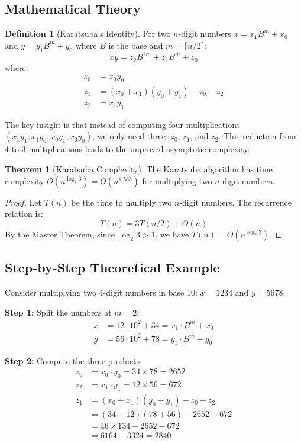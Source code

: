 \documentclass[12pt,a4paper]{article}
\theoremstyle{definition}
\newtheorem{definition}{Definition}[section]
\newtheorem{theorem}{Theorem}[section]
\begin{document}
\subsection{Mathematical Theory}

\begin{definition}[Karatsuba's Identity]
For two $n$-digit numbers $x = x_1B^m + x_0$ and $y = y_1B^m + y_0$ where $B$ is the base and $m = \lceil n/2 \rceil$:
\[xy = z_2B^{2m} + z_1B^m + z_0\]
where:
\begin{align}
z_0 &= x_0y_0\\
z_1 &= (x_0 + x_1)(y_0 + y_1) - z_0 - z_2\\
z_2 &= x_1y_1
\end{align}
\end{definition}

The key insight is that instead of computing four multiplications $(x_1y_1, x_1y_0, x_0y_1, x_0y_0)$, we only need three: $z_0$, $z_1$, and $z_2$. This reduction from 4 to 3 multiplications leads to the improved asymptotic complexity.

\begin{theorem}[Karatsuba Complexity]
The Karatsuba algorithm has time complexity $O(n^{\log_2 3}) = O(n^{1.585})$ for multiplying two $n$-digit numbers.
\end{theorem}

\begin{proof}
Let $T(n)$ be the time to multiply two $n$-digit numbers. The recurrence relation is:
\[T(n) = 3T(n/2) + O(n)\]
By the Master Theorem, since $\log_2 3 > 1$, we have $T(n) = O(n^{\log_2 3})$.
\end{proof}

\subsection{Step-by-Step Theoretical Example}

Consider multiplying two 4-digit numbers in base 10: $x = 1234$ and $y = 5678$.

\textbf{Step 1:} Split the numbers at $m = 2$:
\begin{align}
x &= 12 \cdot 10^2 + 34 = x_1 \cdot B^m + x_0\\
y &= 56 \cdot 10^2 + 78 = y_1 \cdot B^m + y_0
\end{align}

\textbf{Step 2:} Compute the three products:
\begin{align}
z_0 &= x_0 \cdot y_0 = 34 \times 78 = 2652\\
z_2 &= x_1 \cdot y_1 = 12 \times 56 = 672\\
z_1 &= (x_0 + x_1)(y_0 + y_1) - z_0 - z_2\\
    &= (34 + 12)(78 + 56) - 2652 - 672\\
    &= 46 \times 134 - 2652 - 672\\
    &= 6164 - 3324 = 2840
\end{align}
\end{document}
